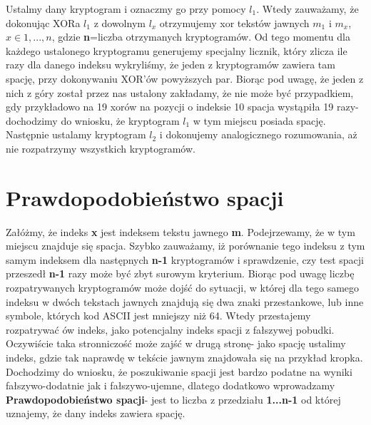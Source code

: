 \documentclass[a4paper,14pt]{report}
\begin{document}
	Ustalmy dany kryptogram i oznaczmy go przy pomocy \textbf{$l_{1}$}. Wtedy zauważamy, że dokonując XORa \textbf{$l_{1}$} z dowolnym \textbf{$l_{x}$} otrzymujemy xor tekstów jawnych \textbf{$m_{1}$} i \textbf{$m_{x}$}, $x \in {1,...,n}$, gdzie \textbf{n}=liczba otrzymanych kryptogramów. Od tego momentu dla każdego ustalonego kryptogramu generujemy specjalny licznik, który zlicza ile razy dla danego indeksu wykryliśmy, że jeden z kryptogramów zawiera tam spację, przy dokonywaniu XOR'ów powyższych par. Biorąc pod uwagę, że jeden z nich z góry został przez nas ustalony zakładamy, że nie może być przypadkiem, gdy przykładowo na 19 xorów na pozycji o indeksie 10 spacja wystąpiła 19 razy- dochodzimy do wniosku, że kryptogram $l_{1}$ w tym miejscu posiada spację. \\
	Następnie ustalamy kryptogram $l_{2}$ i dokonujemy analogicznego rozumowania, aż nie rozpatrzymy wszystkich kryptogramów.
\section{Prawdopodobieństwo spacji}
	Załóżmy, że indeks \textbf{x} jest indeksem tekstu jawnego \textbf{m}. Podejrzewamy, że w tym miejscu znajduje się spacja. Szybko zauważamy, iż porównanie tego indeksu z tym samym indeksem dla następnych \textbf{n-1} kryptogramów i sprawdzenie, czy test spacji przeszedł \textbf{n-1} razy może być zbyt surowym kryterium. Biorąc pod uwagę liczbę rozpatrywanych kryptogramów może dojść do sytuacji, w której dla tego samego indeksu w dwóch tekstach jawnych znajdują się dwa znaki przestankowe, lub inne symbole, których kod ASCII jest mniejszy niż 64. Wtedy przestajemy rozpatrywać ów indeks, jako potencjalny indeks spacji z fałszywej pobudki. Oczywiście taka stronniczość może zajść w drugą stronę- jako spację ustalimy indeks, gdzie tak naprawdę w tekście jawnym znajdowała się na przykład kropka. Dochodzimy do wniosku, że poszukiwanie spacji jest bardzo podatne na wyniki fałszywo-dodatnie jak i fałszywo-ujemne, dlatego dodatkowo wprowadzamy \textbf{Prawdopodobieństwo spacji}- jest to liczba z przedziału \textbf{1...n-1} od której uznajemy, że dany indeks zawiera spację.
\end{document}

